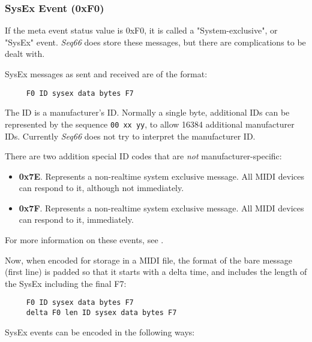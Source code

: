 \subsubsection{SysEx Event (0xF0)}
\label{subsubsec:midi_format_meta_sysex_event}

   If the meta event status value is 0xF0, it is called a "System-exclusive",
   or "SysEx" event.
   \textsl{Seq66} does store these messages, but there are complications
   to be dealt with.

   SysEx messages as sent and received are of the format:

   \begin{verbatim}
     F0 ID sysex data bytes F7
   \end{verbatim}

   The ID is a manufacturer's ID. Normally a single byte, additional IDs can be
   represented by the sequence \texttt{00 xx yy}, to allow 16384 additional
   manufacturer IDs.  Currently \textsl{Seq66} does not try to interpret the
   manufacturer ID.

   There are two addition special ID codes that are \textsl{not}
   manufacturer-specific:

   \begin{itemize}
      \item \textbf{0x7E}.
         Represents a non-realtime system exclusive message.
         All MIDI devices can respond to it, although not immediately.
      \item \textbf{0x7F}.
         Represents a non-realtime system exclusive message.
         All MIDI devices can respond to it, immediately.
   \end{itemize}

   For more information on these events, see
   .

   Now, when encoded for storage in a MIDI file, the format of the bare message
   (first line) is padded so that it starts with a delta time, and includes the
   length of the SysEx including the final F7:

   \begin{verbatim}
     F0 ID sysex data bytes F7
     delta F0 len ID sysex data bytes F7
   \end{verbatim}

   SysEx events can be encoded in the following ways:

